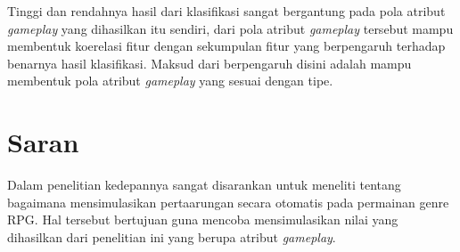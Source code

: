 Tinggi dan rendahnya hasil dari klasifikasi sangat bergantung pada pola atribut \textit{gameplay} yang dihasilkan itu sendiri, dari pola atribut \textit{gameplay} tersebut mampu membentuk koerelasi fitur dengan sekumpulan fitur yang berpengaruh terhadap benarnya hasil klasifikasi. Maksud dari berpengaruh disini adalah mampu membentuk pola atribut \textit{gameplay} yang sesuai dengan tipe.   
\vspace{1ex}

\section{Saran}
\label{sec:sec4_saran}
\vspace{1ex}

Dalam penelitian kedepannya sangat disarankan untuk meneliti tentang bagaimana mensimulasikan pertaarungan secara otomatis pada permainan genre RPG. Hal tersebut bertujuan guna mencoba mensimulasikan nilai yang dihasilkan dari penelitian ini yang berupa atribut \textit{gameplay}.